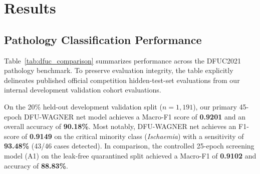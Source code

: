 \documentclass[journal]{IEEEtran}
\begin{document}
\section{Results}

\subsection{Pathology Classification Performance}
Table~\ref{tab:dfuc_comparison} summarizes performance across the DFUC2021 pathology benchmark. To preserve evaluation integrity, the table explicitly delineates published official competition hidden-test-set evaluations from our internal development validation cohort evaluations.

On the 20\% held-out development validation split ($n = 1,191$), our primary 45-epoch DFU-WAGNER net model achieves a Macro-F1 score of \textbf{0.9201} and an overall accuracy of \textbf{90.18\%}. Most notably, DFU-WAGNER net achieves an F1-score of \textbf{0.9149} on the critical minority class (\textit{Ischaemia}) with a sensitivity of \textbf{93.48\%} (43/46 cases detected). In comparison, the controlled 25-epoch screening model (A1) on the leak-free quarantined split achieved a Macro-F1 of \textbf{0.9102} and accuracy of \textbf{88.83\%}.
\end{document}
